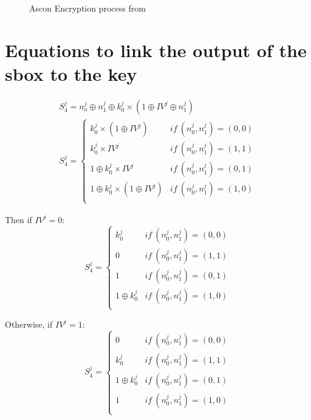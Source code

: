 \documentclass[11pt,technote]{IEEEtran}
\begin{document}
		\begin{figure}[H]
			\centering
			
			\caption{Ascon Encryption process from \cite{cours_crypto}}
			\label{fig:enc}
		\end{figure}
		
		
		\section{Equations to link the output of the \ac{sbox} to the key} \label{equations}
		\begin{gather*}
			S_4^j = n_o^j \oplus n_1^j \oplus k_0^j \times (1 \oplus IV^j \oplus n_1^j)\\
			S _4^j =\left \{	
				\begin{array}{ll}
					k_0^j \times (1 \oplus IV^j) & if\ (n_0^j,n_1^j)=(0,0)\\
					k_0^j \times IV^j & if\ (n_0^j,n_1^j)=(1,1)\\
					1 \oplus k_0^j \times IV^j & if\ (n_0^j,n_1^j)=(0,1)\\
					1 \oplus k_0^j \times (1 \oplus IV^j) & if\ (n_0^j,n_1^j)=(1,0)\\
				\end{array}
					\right.
		\end{gather*}
		 
		 \noindent Then if $IV^j = 0$: 
		 $$S _4^j =\left \{	
		 \begin{array}{ll}
		 	k_0^j& if\ (n_0^j,n_1^j)=(0,0)\\
		 	0& if\ (n_0^j,n_1^j)=(1,1)\\
		 	1& if\ (n_0^j,n_1^j)=(0,1)\\
		 	1 \oplus k_0^j& if\ (n_0^j,n_1^j)=(1,0)\\
		 \end{array}
		 \right.$$
		 
		 \noindent Otherwise, if $IV^j = 1$:
		 $$S _4^j =\left \{	
		 \begin{array}{ll}
		 	0& if\ (n_0^j,n_1^j)=(0,0)\\
		 	k_0^j& if\ (n_0^j,n_1^j)=(1,1)\\
		 	1 \oplus k_0^j& if\ (n_0^j,n_1^j)=(0,1)\\
		 	1& if\ (n_0^j,n_1^j)=(1,0)\\
		 \end{array}
		 \right.$$
		 
		 
\end{document}
